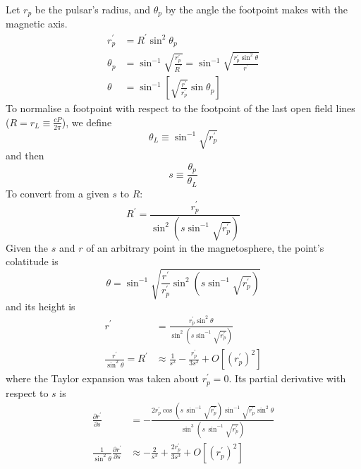 \documentclass{book}
\newcommand{\pd}[2]{\frac{\partial {#1}}{\partial {#2}}}
\begin{document}
Let $r_p$ be the pulsar's radius, and $\theta_p$ by the angle the footpoint makes with the magnetic axis.
\begin{align}
    r_p^\prime &= R^\prime\sin^2\theta_p \\
    \theta_p &= \sin^{-1}\sqrt{\frac{r_p^\prime}{R^\prime}} = \sin^{-1}\sqrt{\frac{r_p^\prime\sin^2\theta}{r^\prime}} \\
    \theta   &= \sin^{-1}\left[\sqrt{\frac{r^\prime}{r_p^\prime}}\sin\theta_p\right] \label{eqn:thp_to_th}
\end{align}
To normalise a footpoint with respect to the footpoint of the last open field lines ($R = r_L \equiv \frac{cP}{2\pi}$), we define
\begin{equation}
    \theta_L \equiv \sin^{-1}\sqrt{r_p^\prime}
\end{equation}
and then
\begin{equation}
    s \equiv \frac{\theta_p}{\theta_L}
\end{equation}
To convert from a given $s$ to $R$:
\begin{equation}
    R^\prime = \frac{r_p^\prime}{\sin^2\left(s\sin^{-1}\sqrt{r_p^\prime}\right)}
\end{equation}
Given the $s$ and $r$ of an arbitrary point in the magnetosphere, the point's colatitude is
\begin{equation}
    \theta = \sin^{-1}\sqrt{\frac{r^\prime}{r_p^\prime}\sin^2\left(s \sin^{-1}\sqrt{r_p^\prime}\right)}
\end{equation}
and its height is
\begin{equation}
    \begin{aligned}
        r^\prime &= \frac{r_p^\prime\sin^2\theta}{\sin^2\left(s \sin^{-1}\sqrt{r_p^\prime}\right)} \\
        \frac{r^\prime}{\sin^2\theta} = R^\prime &\approx \frac{1}{s^2} - \frac{r_p^\prime}{3s^2} + O\left[(r_p^\prime)^2\right]
    \end{aligned}
\end{equation}
where the Taylor expansion was taken about $r_p^\prime = 0$.
Its partial derivative with respect to $s$ is
\begin{equation}
    \begin{aligned}
        \pd{r^\prime}{s} &= -\frac{2r_p^\prime \cos\left(s\,\sin^{-1}\sqrt{r_p^\prime}\right) \sin^{-1}\sqrt{r_p^\prime} \sin^2\theta}{
                                   \sin^3\left(s\,\sin^{-1}\sqrt{r_p^\prime}\right)} \\
        \frac{1}{\sin^2\theta} \pd{r^\prime}{s} &\approx -\frac{2}{s^3} + \frac{2r_p^\prime}{3s^3} + O\left[\left(r_p^\prime\right)^2\right]
    \end{aligned}
\end{equation}
\end{document}
